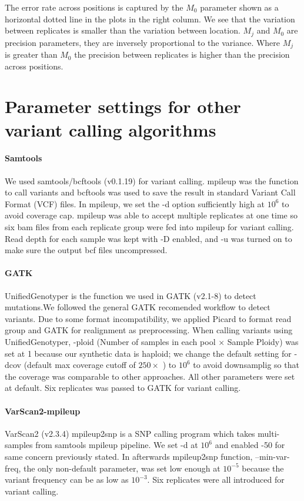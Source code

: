 \documentclass[11pt,reqno]{amsart}
\begin{document}
The error rate across positions is captured by the $M_0$ parameter shown as a horizontal dotted line in the plots in the right column. We see that the variation between replicates is smaller than the variation between location. $M_j$ and $M_0$ are precision parameters, they are inversely proportional to the variance. Where $M_j$ is greater than $M_0$ the precision between replicates is higher than the precision across positions.


\section{Parameter settings for other variant calling algorithms}

\paragraph{\textbf{Samtools}}We used samtools/bcftools (v0.1.19) for variant calling. mpileup was the function to call variants and bcftools was used to save the result in standard Variant Call Format (VCF) files. In mpileup, we set the -d option sufficiently high at $10^6$ to avoid coverage cap.  mpileup was able to accept multiple replicates at one time so six bam files from each replicate group were fed into mpileup for variant calling. Read depth for each sample was kept with -D enabled, and -u was turned on to make sure the output bcf files uncompressed. 

\paragraph{\textbf{GATK}}
UnifiedGenotyper is the function we used in GATK (v2.1-8) to detect mutations.We followed the general GATK recomended workflow to detect variants. Due to some format  incompatibility, we applied Picard to format read group and GATK for realignment as preprocessing. When calling variants using UnifiedGenotyper, -ploid (Number of samples in each pool $\times$ Sample Ploidy) was set at 1 because our synthetic data is haploid; we change the default setting for -dcov (default max coverage cutoff of $250\times$ ) to $10^6$ to avoid downsamplig so that the coverage was comparable to other approaches. All other parameters were set at default. Six replicates was passed to GATK for variant calling.

\paragraph{\textbf{VarScan2-mpileup}}
VarScan2 (v2.3.4) mpileup2snp is a SNP calling program which takes multi-samples from samtools mpileup pipeline. We set -d at $10^6$ and enabled -50 for same concern previously stated. In afterwards mpileup2snp function, --min-var-freq, the only non-default parameter, was set low enough at $10^{-5}$ because the variant frequency can be as low as $10^{-3}$. Six replicates were all introduced for variant calling.
\end{document}
